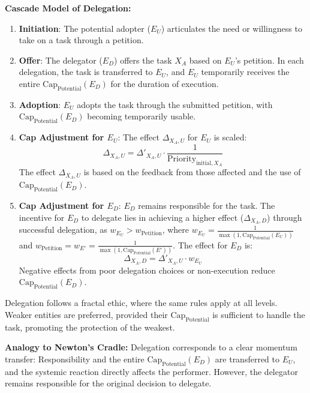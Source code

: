 \documentclass[12pt]{scrartcl}
\begin{document}
\textbf{Cascade Model of Delegation:}
\begin{enumerate}
    \item \textbf{Initiation}: The potential adopter ($E_U$) articulates the need or willingness to take on a task through a petition.
    \item \textbf{Offer}: The delegator ($E_D$) offers the task $X_A$ based on $E_U$’s petition. In each delegation, the task is transferred to $E_U$, and $E_U$ temporarily receives the entire $\text{Cap}_{\text{Potential}}(E_D)$ for the duration of execution.
    \item \textbf{Adoption}: $E_U$ adopts the task through the submitted petition, with $\text{Cap}_{\text{Potential}}(E_D)$ becoming temporarily usable.
    \item \textbf{Cap Adjustment for $E_U$}: The effect $\Delta_{X_A,U}$ for $E_U$ is scaled:
    \begin{equation}
    \Delta_{X_A,U} = \Delta'_{X_A,U} \cdot \frac{1}{\text{Priority}_{\text{initial}, X_A}}
    \label{eq:SkalierteWirkung}
    \end{equation}
    The effect $\Delta_{X_A,U}$ is based on the feedback from those affected and the use of $\text{Cap}_{\text{Potential}}(E_D)$.
    \item \textbf{Cap Adjustment for $E_D$}: $E_D$ remains responsible for the task. The incentive for $E_D$ to delegate lies in achieving a higher effect ($\Delta_{X_A,D}$) through successful delegation, as $w_{E_U} > w_{\text{Petition}}$, where $w_{E_U} = \frac{1}{\max(1, \text{Cap}_{\text{Potential}}(E_U))}$ and $w_{\text{Petition}} = w_{E'} = \frac{1}{\max(1, \text{Cap}_{\text{Potential}}(E'))}$. The effect for $E_D$ is:
    \begin{equation}
    \Delta_{X_A,D} = \Delta'_{X_A,U} \cdot w_{E_U}
    \label{eq:WirkungED}
    \end{equation}
    Negative effects from poor delegation choices or non-execution reduce $\text{Cap}_{\text{Potential}}(E_D)$.
\end{enumerate}
Delegation follows a fractal ethic, where the same rules apply at all levels. Weaker entities are preferred, provided their $\text{Cap}_{\text{Potential}}$ is sufficient to handle the task, promoting the protection of the weakest.

\textbf{Analogy to Newton’s Cradle:}
Delegation corresponds to a clear momentum transfer: Responsibility and the entire $\text{Cap}_{\text{Potential}}(E_D)$ are transferred to $E_U$, and the systemic reaction directly affects the performer. However, the delegator remains responsible for the original decision to delegate.
\end{document}
